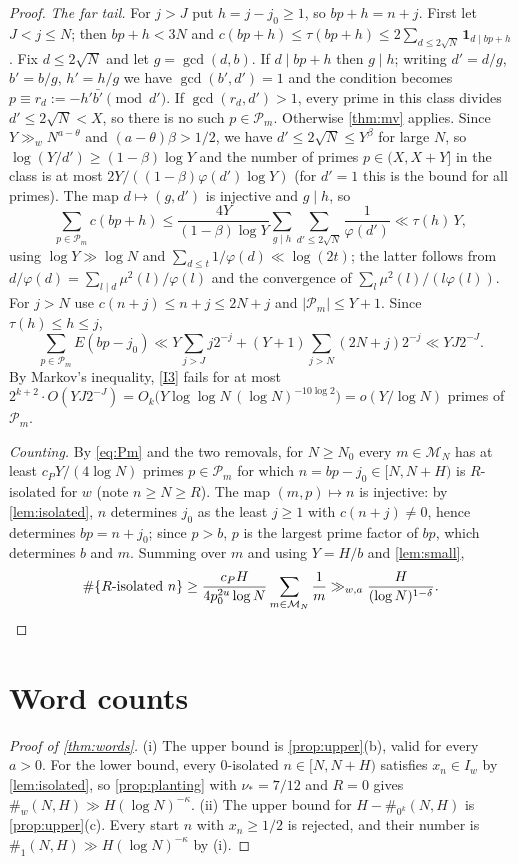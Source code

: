 \documentclass[11pt]{article}
\newcommand{\ind}{\mathbf 1}
\newcommand{\Mset}{\mathcal M}
\newcommand{\Pset}{\mathcal P}
\newcommand{\cnt}{\#}
\begin{document}
\begin{proof}
\emph{The far tail.} For $j>J$ put $h=j-j_0\ge1$, so $bp+h=n+j$. First let
$J<j\le N$; then $bp+h<3N$ and $c(bp+h)\le\tau(bp+h)\le2\sum_{d\le2\sqrt N}\ind_{d\mid bp+h}$.
Fix $d\le2\sqrt N$ and let $g=\gcd(d,b)$. If $d\mid bp+h$ then $g\mid h$;
writing $d'=d/g$, $b'=b/g$, $h'=h/g$ we have $\gcd(b',d')=1$ and the condition
becomes $p\equiv r_d:=-h'\bar{b'}\pmod{d'}$. If $\gcd(r_d,d')>1$, every prime in
this class divides $d'\le2\sqrt N<X$, so there is no such $p\in\Pset_m$.
Otherwise \cref{thm:mv} applies. Since $Y\gg_wN^{a-\theta}$ and
$(a-\theta)\beta>1/2$, we have $d'\le2\sqrt N\le Y^{\beta}$ for large $N$, so
$\log(Y/d')\ge(1-\beta)\log Y$ and the number of primes $p\in(X,X+Y]$ in the
class is at most $2Y/((1-\beta)\varphi(d')\log Y)$ (for $d'=1$ this is the bound
for all primes). The map $d\mapsto(g,d')$ is injective and $g\mid h$, so
\[
\sum_{p\in\Pset_m}c(bp+h)\le\frac{4Y}{(1-\beta)\log Y}\sum_{g\mid h}\sum_{d'\le2\sqrt N}\frac1{\varphi(d')}
\ll\tau(h)\,Y,
\]
using $\log Y\gg\log N$ and $\sum_{d\le t}1/\varphi(d)\ll\log(2t)$; the latter follows
from $d/\varphi(d)=\sum_{l\mid d}\mu^2(l)/\varphi(l)$ and the convergence of
$\sum_l\mu^2(l)/(l\varphi(l))$. For $j>N$ use $c(n+j)\le n+j\le2N+j$ and
$|\Pset_m|\le Y+1$. Since $\tau(h)\le h\le j$,
\[
\sum_{p\in\Pset_m}E(bp-j_0)\ll Y\sum_{j>J}j2^{-j}+(Y+1)\sum_{j>N}(2N+j)2^{-j}
\ll YJ2^{-J}.
\]
By Markov's inequality, \ref{I3} fails for at most
$2^{k+2}\cdot O(YJ2^{-J})=O_k\bigl(Y\log\log N\,(\log N)^{-10\log2}\bigr)=o(Y/\log N)$
primes of $\Pset_m$.

\emph{Counting.} By \eqref{eq:Pm} and the two removals, for $N\ge N_0$ every
$m\in\Mset_N$ has at least $c_PY/(4\log N)$ primes $p\in\Pset_m$ for
which $n=bp-j_0\in[N,N+H)$ is $R$-isolated for $w$ (note $n\ge N\ge R$). The map
$(m,p)\mapsto n$ is injective: by \cref{lem:isolated}, $n$ determines $j_0$ as
the least $j\ge1$ with $c(n+j)\ne0$, hence determines $bp=n+j_0$; since $p>b$,
$p$ is the largest prime factor of $bp$, which determines $b$ and $m$.
Summing over $m$ and using $Y=H/b$ and \cref{lem:small},
\[
\#\{\text{$R$-isolated }n\}\ge\frac{c_PH}{4p_0^{2u}\log N}\sum_{m\in\Mset_N}\frac1m
\gg_{w,a}\frac{H}{(\log N)^{1-\delta}} .\qedhere
\]
\end{proof}

\section{Word counts}\label{sec:words}

\begin{proof}[Proof of \cref{thm:words}]
(i) The upper bound is \cref{prop:upper}(b), valid for every $a>0$. For the
lower bound, every $0$-isolated $n\in[N,N+H)$ satisfies $x_n\in I_w$ by
\cref{lem:isolated}, so \cref{prop:planting} with $\nu_*=7/12$ and $R=0$ gives
$\cnt_w(N,H)\gg H(\log N)^{-\kappa}$.
(ii) The upper bound for $H-\cnt_{0^k}(N,H)$ is \cref{prop:upper}(c). Every
start $n$ with $x_n\ge1/2$ is rejected, and their number is
$\cnt_1(N,H)\gg H(\log N)^{-\kappa}$ by (i).
\end{proof}
\end{document}
